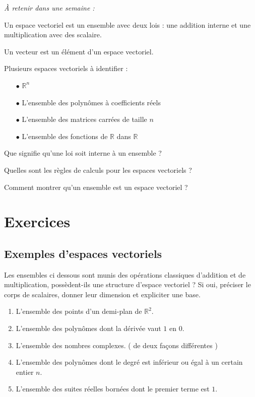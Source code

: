 
\begin{resumeBox}
  \emph{À retenir dans une semaine :} 
  \begin{niceitemize}
    \item Un espace vectoriel est un ensemble avec deux lois : une addition interne et une multiplication avec des scalaire.
    \item Un vecteur est un élément d'un espace vectoriel.
    \item Plusieurs espaces vectoriels à identifier :
      \begin{itemize}
        \item[$\bullet$] $\mathbb{R}^n$
        \item[$\bullet$] L'ensemble des polynômes à coefficients réels
        \item[$\bullet$] L'ensemble des matrices carrées de taille $n$
        \item[$\bullet$] L'ensemble des fonctions de $\mathbb{R}$ dans $\mathbb{R}$
      \end{itemize}
  \end{niceitemize}
\end{resumeBox}

\begin{rappelsBox}
  \begin{niceitemize}
    \item Que signifie qu'une loi soit interne à un ensemble ?
    \item Quelles sont les règles de calculs pour les espaces vectoriels ?
    \item Comment montrer qu'un ensemble est un espace vectoriel ?
  \end{niceitemize}
\end{rappelsBox}

\section{Exercices}
  \subsection{Exemples d'espaces vectoriels}

  Les ensembles ci dessous sont munis des opérations classiques d'addition et de multiplication, possèdent-ils une structure d'espace vectoriel ? \newline 
  Si oui, préciser le corps de scalaires, donner leur dimension et expliciter une base.
  
  \begin{enumerate}
      \item L'ensemble des points d'un demi-plan de \(\mathbb{R}^2\).
      \item L'ensemble des polynômes dont la dérivée vaut $1$ en $0$.
      \item L'ensemble des nombres complexes. ( de deux façons différentes )
      \item L'ensemble des polynômes dont le degré est inférieur ou égal à un certain entier $n$.
      \item L'ensemble des suites réelles bornées dont le premier terme est $1$.
  \end{enumerate}
  
